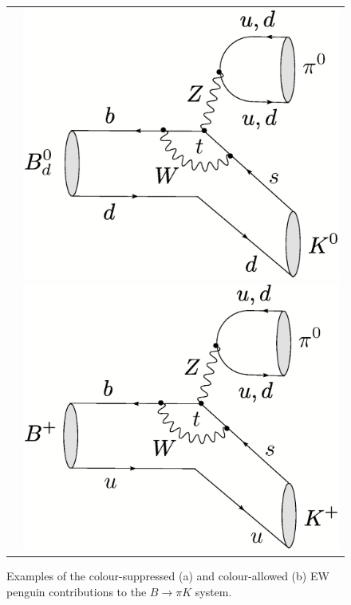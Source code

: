 \documentclass[11pt]{cernrep}
\begin{document}
\begin{figure}
{\begin{tabular}{lc}
    &     \includegraphics[width=5.2truecm]{B0dtopi0K0-EW-pen.ps} 
     \hspace*{0.5truecm}
    \includegraphics[width=5.2truecm]{Bptopi0KP-EW-pen.ps} 
     \end{tabular}}
     \caption{Examples of the colour-suppressed (a) and colour-allowed (b) 
     EW penguin contributions to the $B\to\pi K$ system.}\label{fig:BpiK-EWP}
\end{figure}
\end{document}
